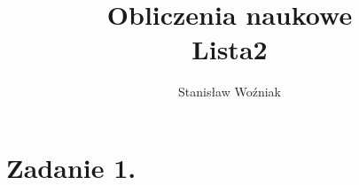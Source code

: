 \documentclass[11pt, a4paper]{article}
\title{Obliczenia naukowe\\Lista2}
\author{Stanisław Woźniak}
\date{}
\begin{document}
    \maketitle
    \section{Zadanie 1.}
\end{document}

